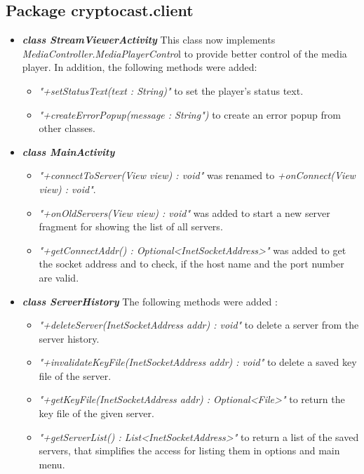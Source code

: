 \documentclass[a4paper,10pt]{scrartcl}
\begin{document}
\subsection{Package cryptocast.client}


\begin{itemize}

\item \textbf{\textit{class StreamViewerActivity}} \newline
   This class now implements  \textit{MediaController.MediaPlayerContro}l to provide better 
	control of the media player. In addition, the following methods were added:
	\begin{itemize}
	 \item \textit{"+setStatusText(text : String)"} to set the player's status text.
	 \item \textit{"+createErrorPopup(message : String")} to create an error popup from other classes.
	\end{itemize}
	
	 \item \textbf{\textit{class MainActivity}}
	\begin{itemize}
	 \item \textit{"+connectToServer(View view) : void"} was renamed to \textit{+onConnect(View view) : void"}.
	 \item \textit{"+onOldServers(View view) : void"} was added to start a new server fragment for showing the 
	  list of all servers.
		\item \textit{"+getConnectAddr() : Optional<InetSocketAddress>"} was added to get the socket address 
		and to check, if the host name and the port number are valid.
	\end{itemize}
	
	\item \textbf{\textit{class ServerHistory}} \newline
	The following methods were added :
	\begin{itemize}
   \item \textit{"+deleteServer(InetSocketAddress addr) : void"} to delete a server from the server history.
	 \item \textit{"+invalidateKeyFile(InetSocketAddress addr) : void"} to delete a saved key file of the server.
	 \item \textit{"+getKeyFile(InetSocketAddress addr) : Optional<File>"} to return the key file of the given server.
	 \item \textit{"+getServerList() : List<InetSocketAddress>"} to return a list of the saved servers, that simplifies the access for listing them in options and main menu.
	\end{itemize}


\end{itemize}
\end{document}
